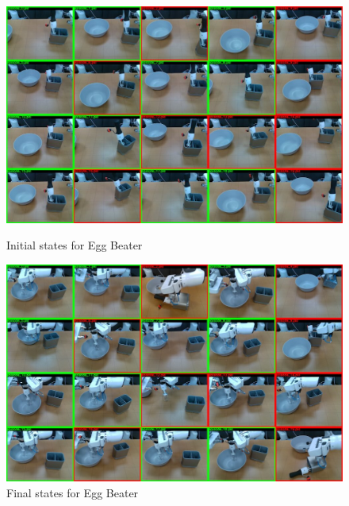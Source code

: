 \begin{figure}
    \centering
    \includegraphics[width=\linewidth]{figure/ijrr24_egg_beater_ini.jpg}
    \caption{Initial states for Egg Beater}
    \label{fig:egg_beater_ini}
    \centering
    \includegraphics[width=\linewidth]{figure/ijrr24_egg_beater_last.jpg}
    \caption{Final states for Egg Beater}
    \label{fig:egg_beater_last}
\end{figure}


